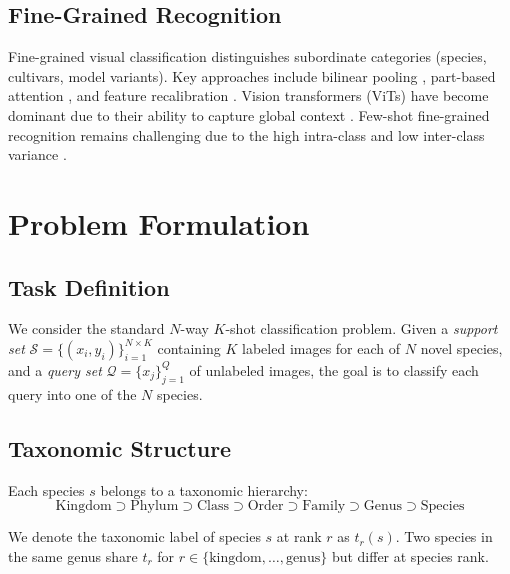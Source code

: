 \documentclass[11pt,a4paper]{article}
\newcommand{\Support}{\mathcal{S}}
\newcommand{\Query}{\mathcal{Q}}
\begin{document}
\subsection{Fine-Grained Recognition}

Fine-grained visual classification distinguishes subordinate categories
(species, cultivars, model variants). Key approaches include bilinear
pooling \citep{lin2015bilinear}, part-based attention
\citep{zheng2017learning}, and feature recalibration
\citep{hu2018squeeze}. Vision transformers (ViTs) have become dominant
due to their ability to capture global context
\citep{dosovitskiy2021image, he2022transfg}. Few-shot fine-grained
recognition remains challenging due to the high intra-class and low
inter-class variance \citep{wei2019piecewise}.


\section{Problem Formulation}
\label{sec:problem}

\subsection{Task Definition}

We consider the standard $N$-way $K$-shot classification problem. Given a
\emph{support set} $\Support = \{(x_i, y_i)\}_{i=1}^{N \times K}$
containing $K$ labeled images for each of $N$ novel species, and a
\emph{query set} $\Query = \{x_j\}_{j=1}^{Q}$ of unlabeled images, the
goal is to classify each query into one of the $N$ species.

\subsection{Taxonomic Structure}

Each species $s$ belongs to a taxonomic hierarchy:
\begin{equation}
  \text{Kingdom} \supset \text{Phylum} \supset \text{Class} \supset
  \text{Order} \supset \text{Family} \supset \text{Genus} \supset
  \text{Species}
\end{equation}

We denote the taxonomic label of species $s$ at rank $r$ as $t_r(s)$.
Two species in the same genus share $t_r$ for $r \in
\{\text{kingdom}, \ldots, \text{genus}\}$ but differ at species rank.
\end{document}

